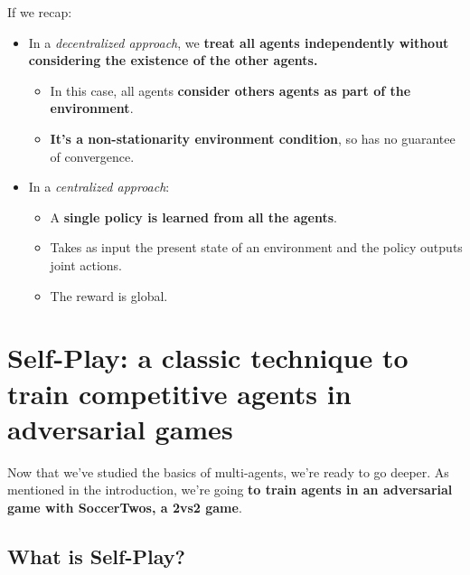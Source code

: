 \documentclass[11pt,a4paper]{article}
\begin{document}
If we recap:

\begin{itemize}
\tightlist
\item
  In a \emph{decentralized approach}, we \textbf{treat all agents independently without considering the existence of the other agents.}

  \begin{itemize}
  \tightlist
  \item
    In this case, all agents \textbf{consider others agents as part of the environment}.
  \item
    \textbf{It's a non-stationarity environment condition}, so has no guarantee of convergence.
  \end{itemize}
\item
  In a \emph{centralized approach}:

  \begin{itemize}
  \tightlist
  \item
    A \textbf{single policy is learned from all the agents}.
  \item
    Takes as input the present state of an environment and the policy outputs joint actions.
  \item
    The reward is global.
  \end{itemize}
\end{itemize}

\section{Self-Play: a classic technique to train competitive agents in adversarial games}\label{self-play-a-classic-technique-to-train-competitive-agents-in-adversarial-games}

Now that we've studied the basics of multi-agents, we're ready to go deeper. As mentioned in the introduction, we're going \textbf{to train agents in an adversarial game with SoccerTwos, a 2vs2 game}.


\subsection{What is Self-Play?}\label{what-is-self-play}
\end{document}
